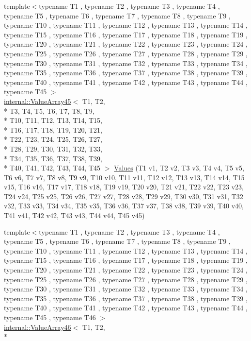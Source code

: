 \begin{DoxyCompactItemize}
\item 
{\footnotesize template$<$typename T1 , typename T2 , typename T3 , typename T4 , typename T5 , typename T6 , typename T7 , typename T8 , typename T9 , typename T10 , typename T11 , typename T12 , typename T13 , typename T14 , typename T15 , typename T16 , typename T17 , typename T18 , typename T19 , typename T20 , typename T21 , typename T22 , typename T23 , typename T24 , typename T25 , typename T26 , typename T27 , typename T28 , typename T29 , typename T30 , typename T31 , typename T32 , typename T33 , typename T34 , typename T35 , typename T36 , typename T37 , typename T38 , typename T39 , typename T40 , typename T41 , typename T42 , typename T43 , typename T44 , typename T45 $>$ }\\\hyperlink{classtesting_1_1internal_1_1ValueArray45}{internal\-::\-Value\-Array45}$<$ T1, T2, \\*
T3, T4, T5, T6, T7, T8, T9, \\*
T10, T11, T12, T13, T14, T15, \\*
T16, T17, T18, T19, T20, T21, \\*
T22, T23, T24, T25, T26, T27, \\*
T28, T29, T30, T31, T32, T33, \\*
T34, T35, T36, T37, T38, T39, \\*
T40, T41, T42, T43, T44, T45 $>$ \hyperlink{namespacetesting_a227b4b3b251f5f4aa0e1261c27fe9dd4}{Values} (T1 v1, T2 v2, T3 v3, T4 v4, T5 v5, T6 v6, T7 v7, T8 v8, T9 v9, T10 v10, T11 v11, T12 v12, T13 v13, T14 v14, T15 v15, T16 v16, T17 v17, T18 v18, T19 v19, T20 v20, T21 v21, T22 v22, T23 v23, T24 v24, T25 v25, T26 v26, T27 v27, T28 v28, T29 v29, T30 v30, T31 v31, T32 v32, T33 v33, T34 v34, T35 v35, T36 v36, T37 v37, T38 v38, T39 v39, T40 v40, T41 v41, T42 v42, T43 v43, T44 v44, T45 v45)
\item 
{\footnotesize template$<$typename T1 , typename T2 , typename T3 , typename T4 , typename T5 , typename T6 , typename T7 , typename T8 , typename T9 , typename T10 , typename T11 , typename T12 , typename T13 , typename T14 , typename T15 , typename T16 , typename T17 , typename T18 , typename T19 , typename T20 , typename T21 , typename T22 , typename T23 , typename T24 , typename T25 , typename T26 , typename T27 , typename T28 , typename T29 , typename T30 , typename T31 , typename T32 , typename T33 , typename T34 , typename T35 , typename T36 , typename T37 , typename T38 , typename T39 , typename T40 , typename T41 , typename T42 , typename T43 , typename T44 , typename T45 , typename T46 $>$ }\\\hyperlink{classtesting_1_1internal_1_1ValueArray46}{internal\-::\-Value\-Array46}$<$ T1, T2, \\*

\end{DoxyCompactItemize}
